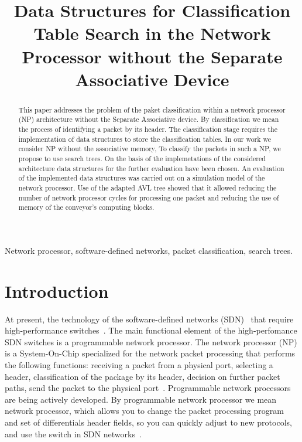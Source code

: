 \documentclass[conference]{IEEEtran}
\begin{document}
\title{
    Data Structures for Classification Table Search in the Network Processor without the Separate Associative Device
}
\maketitle
    \begin{abstract}
        This paper addresses the problem of the paket classification within a network processor (NP) architecture 
        without the Separate Associative device.
        By classification we mean the process of identifying a packet by its header.
        The classification stage requires the implementation of data structures to store the classification tables.
        In our work we consider NP without the associative memory,
        To classify the packets in such a NP, we propose to use search trees.
        On the basis of the implemetations of the considered architecture 
        data structures for the further evaluation have been chosen.
        An evaluation of the implemented data structures was carried out on a 
        simulation model of the network processor.
        Use of the adapted AVL tree showed that it allowed reducing 
        the number of network processor cycles for processing one packet and reducing the use of memory of the conveyor's computing blocks.
    \end{abstract}
    
    \begin{IEEEkeywords}
        Network processor, software-defined networks, packet classification, search trees.
    \end{IEEEkeywords}
    
    \section{Introduction}
        At present, the technology of the software-defined
        networks (SDN)~\cite{smel2012open} that require high-performance 
        switches~\cite{bifulco2018survey}. The main functional element of the high-perfomance SDN switches
        is a programmable network processor.
        The network processor (NP) is a System-On-Chip specialized for the network packet processing that performs the following functions:
        receiving a packet from a physical port, selecting a header,
        classification of the package by its header, decision on further 
        packet paths, send the packet to the physical port~\cite{chao2007high:1}.
        Programmable network processors are being actively developed.
        By programmable network processor we mean network processor, 
        which allows you to change the packet processing program and set of differentials 
        header fields, so you can quickly adjust to new protocols, 
        and use the switch in SDN networks~\cite{bezzubtsev2019ob-odnom183708319}.
\end{document}
